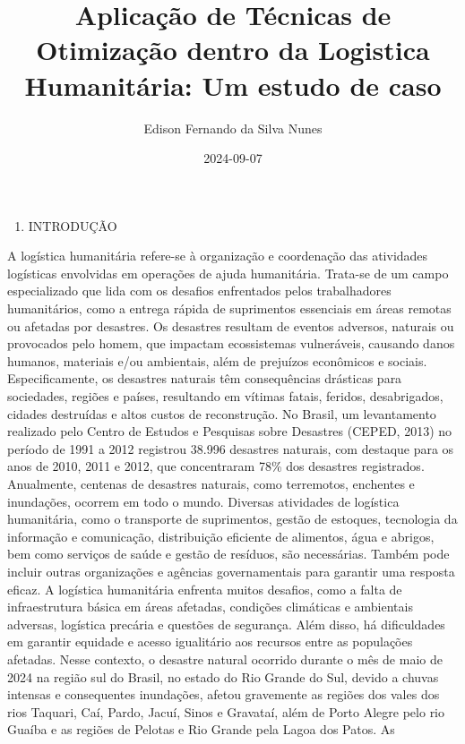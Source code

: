 \documentclass[
]{article}
\title{Aplicação de Técnicas de Otimização dentro da Logistica
Humanitária: Um estudo de caso}
\author{Edison Fernando da Silva Nunes}
\date{2024-09-07}
\providecommand{\tightlist}{%
  \setlength{\itemsep}{0pt}\setlength{\parskip}{0pt}}
\begin{document}
\maketitle

\begin{enumerate}
\def\labelenumi{\arabic{enumi}.}
\tightlist
\item
  INTRODUÇÃO
\end{enumerate}

A logística humanitária refere-se à organização e coordenação das
atividades logísticas envolvidas em operações de ajuda humanitária.
Trata-se de um campo especializado que lida com os desafios enfrentados
pelos trabalhadores humanitários, como a entrega rápida de suprimentos
essenciais em áreas remotas ou afetadas por desastres. Os desastres
resultam de eventos adversos, naturais ou provocados pelo homem, que
impactam ecossistemas vulneráveis, causando danos humanos, materiais
e/ou ambientais, além de prejuízos econômicos e sociais.
Especificamente, os desastres naturais têm consequências drásticas para
sociedades, regiões e países, resultando em vítimas fatais, feridos,
desabrigados, cidades destruídas e altos custos de reconstrução. No
Brasil, um levantamento realizado pelo Centro de Estudos e Pesquisas
sobre Desastres (CEPED, 2013) no período de 1991 a 2012 registrou 38.996
desastres naturais, com destaque para os anos de 2010, 2011 e 2012, que
concentraram 78\% dos desastres registrados. Anualmente, centenas de
desastres naturais, como terremotos, enchentes e inundações, ocorrem em
todo o mundo. Diversas atividades de logística humanitária, como o
transporte de suprimentos, gestão de estoques, tecnologia da informação
e comunicação, distribuição eficiente de alimentos, água e abrigos, bem
como serviços de saúde e gestão de resíduos, são necessárias. Também
pode incluir outras organizações e agências governamentais para garantir
uma resposta eficaz. A logística humanitária enfrenta muitos desafios,
como a falta de infraestrutura básica em áreas afetadas, condições
climáticas e ambientais adversas, logística precária e questões de
segurança. Além disso, há dificuldades em garantir equidade e acesso
igualitário aos recursos entre as populações afetadas. Nesse contexto, o
desastre natural ocorrido durante o mês de maio de 2024 na região sul do
Brasil, no estado do Rio Grande do Sul, devido a chuvas intensas e
consequentes inundações, afetou gravemente as regiões dos vales dos rios
Taquari, Caí, Pardo, Jacuí, Sinos e Gravataí, além de Porto Alegre pelo
rio Guaíba e as regiões de Pelotas e Rio Grande pela Lagoa dos Patos. As
\end{document}
